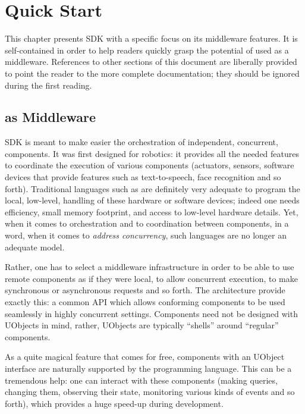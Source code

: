 \chapter{Quick Start}
\label{sec:uob:quick}

This chapter presents \urbi SDK with a specific focus on its
middleware features.  It is self-contained in order to help readers
quickly grasp the potential of \urbi used as a middleware.  References
to other sections of this document are liberally provided to point the
reader to the more complete documentation; they should be ignored
during the first reading.

\section{\urbi as Middleware}

\urbi SDK is meant to make easier the orchestration of independent,
concurrent, components.  It was first designed for robotics: it
provides all the needed features to coordinate the execution of
various components (actuators, sensors, software devices that provide
features such as text-to-speech, face recognition and so forth).
Traditional languages such as \Cxx are definitely very adequate to
program the local, low-level, handling of these hardware or software
devices; indeed one needs efficiency, small memory footprint, and
access to low-level hardware details.  Yet, when it comes to
orchestration and to coordination between components, in a word, when
it comes to \emph{address concurrency}, such languages are no longer
an adequate model.

Rather, one has to select a middleware infrastructure in order to be
able to use remote components as if they were local, to allow
concurrent execution, to make synchronous or asynchronous requests and
so forth.  The  architecture provide exactly this: a
common API which allows conforming components to be used seamlessly in
highly concurrent settings.  Components need not be designed with
UObjects in mind, rather, UObjects are typically ``shells'' around
``regular'' components.

As a quite magical feature that comes for free, components with an
UObject interface are naturally supported by the \us programming
language.  This can be a tremendous help: one can interact with these
components (making queries, changing them, observing their state,
monitoring various kinds of events and so forth), which provides a
huge speed-up during development.

